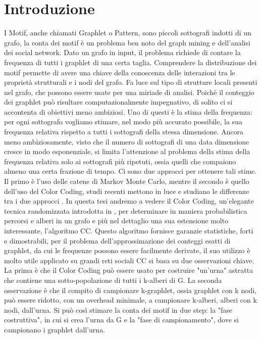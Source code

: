 \chapter{Introduzione}

I Motif, anche chiamati Graphlet o Pattern, sono piccoli sottografi indotti di un grafo, la conta dei motif \`e un problema ben noto del graph mining e dell'analisi dei social network.
Dato un grafo in input, il problema richiede di contare la frequenza di tutti i graphlet di una certa taglia. 
Comprendere la distribuzione dei motif permette di avere una chiave della conoscenza delle interazioni tra le propriet\`a strutturali e i nodi del grafo.
Fa luce sul tipo di strutture locali presenti nel grafo, che possono essere usate per una miriade di analisi.
Poich\`e il conteggio dei graphlet pu\`o risultare computazionalmente impegnativo, di solito ci si accontenta di obiettivi meno ambiziosi.
Uno di questi \`e la stima della frequenza: per ogni sottografo vogliamo stimare, nel modo pi\`u accurato possibile, la sua frequenza relativa rispetto a tutti i sottografi della stessa dimensione.
Ancora meno ambiziosamente, visto che il numero di sottografi di una data dimensione cresce in modo esponenziale, si limita l'attenzione al problema della stima della frequenza relativa solo ai sottografi pi\`u ripetuti, ossia quelli che compaiono almeno una certa frazione di tempo.
Ci sono due approcci per ottenere tali stime.
Il primo \`e l'uso delle catene di Markov Monte Carlo, mentre il secondo \`e quello dell'uso del Color Coding, studi recenti mettono in luce e studiano le differenze tra i due approcci \cite{bressan2018motif}.
In questa tesi andremo a vedere il Color Coding, un'elegante tecnica randomizzata introdotta in \cite{alon1995color}, per determinare in maniera probabilistica percorsi e alberi in un grafo e pi\`u nel dettaglio una sua estensione molto interessante, l'algoritmo CC.
Questo algoritmo fornisce garanzie statistiche, forti e dimostrabili, per il problema dell'approssimazione dei conteggi esatti di graphlet, da cui le frequenze possono essere facilmente derivate, il suo utilizzo \`e molto utile applicato su grandi reti sociali \cite{bressan2018motif,bressan2019motivo}
CC si basa su due osservazioni chiave.
La prima \`e che il Color Coding pu\`o essere usato per costruire "un'urna" astratta che contiene una sotto-popolazione di tutti i k-alberi di G.
La seconda osservazione \`e che il compito di campionare k-graphlet, ossia graphlet con k nodi, pu\`o essere ridotto, con un overhead minimale, a campionare k-alberi, alberi con k nodi, dall'urna.
Si pu\`o cos\`i stimare la conta dei motif in due step: la "fase costruttiva", in cui si crea l'urna da G e la "fase di campionamento", dove si campionano i graphlet dall'urna.


